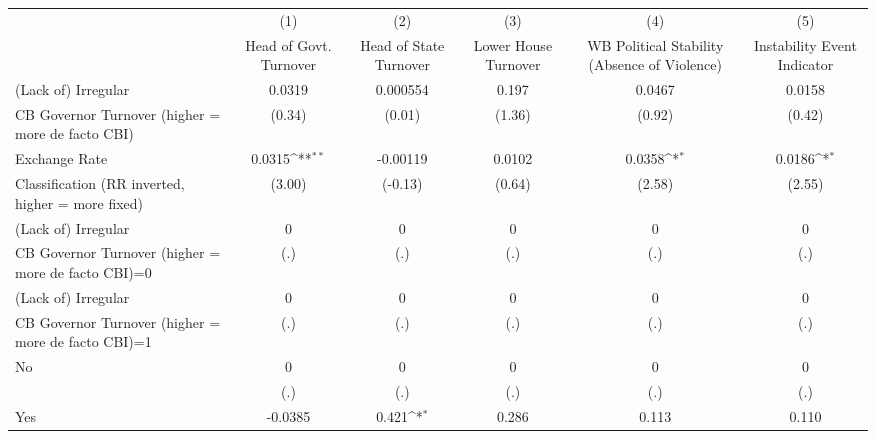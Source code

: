 {
\def\sym#1{\ifmmode^{#1}\else\(^{#1}\)\fi}
\begin{tabular}{l*{5}{c}}
\hline\hline
                    &\multicolumn{1}{c}{(1)}&\multicolumn{1}{c}{(2)}&\multicolumn{1}{c}{(3)}&\multicolumn{1}{c}{(4)}&\multicolumn{1}{c}{(5)}\\
                    &\multicolumn{1}{c}{Head of Govt. Turnover}&\multicolumn{1}{c}{Head of State Turnover}&\multicolumn{1}{c}{Lower House Turnover}&\multicolumn{1}{c}{WB Political Stability (Absence of Violence)}&\multicolumn{1}{c}{Instability Event Indicator}\\
\hline
(Lack of) Irregular &      0.0319         &    0.000554         &       0.197         &      0.0467         &      0.0158         \\
CB Governor Turnover (higher = more de facto CBI)&      (0.34)         &      (0.01)         &      (1.36)         &      (0.92)         &      (0.42)         \\
[1em]
Exchange Rate       &      0.0315\sym{**} &    -0.00119         &      0.0102         &      0.0358\sym{*}  &      0.0186\sym{*}  \\
Classification (RR inverted, higher = more fixed)&      (3.00)         &     (-0.13)         &      (0.64)         &      (2.58)         &      (2.55)         \\
[1em]
(Lack of) Irregular &           0         &           0         &           0         &           0         &           0         \\
CB Governor Turnover (higher = more de facto CBI)=0&         (.)         &         (.)         &         (.)         &         (.)         &         (.)         \\
[1em]
(Lack of) Irregular &           0         &           0         &           0         &           0         &           0         \\
CB Governor Turnover (higher = more de facto CBI)=1&         (.)         &         (.)         &         (.)         &         (.)         &         (.)         \\
[1em]
No                  &           0         &           0         &           0         &           0         &           0         \\
                    &         (.)         &         (.)         &         (.)         &         (.)         &         (.)         \\
[1em]
Yes                 &     -0.0385         &       0.421\sym{*}  &       0.286         &       0.113         &       0.110         \\

\end{tabular}}
